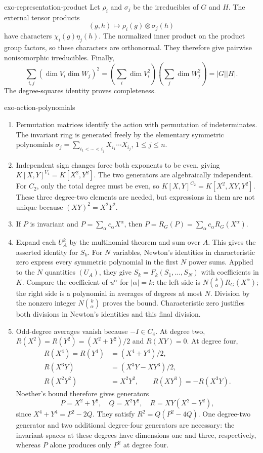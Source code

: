 \begin{correction}{exo-representation-product}
Let $\rho_i$ and $\sigma_j$ be the irreducibles of $G$ and $H$.
The external tensor products
\[
 (g,h)\longmapsto\rho_i(g)\otimes\sigma_j(h)
\]
have characters $\chi_i(g)\eta_j(h)$. The normalized inner product
on the product group factors, so these characters are orthonormal.
They therefore give pairwise nonisomorphic irreducibles. Finally,
\[
 \sum_{i,j}(\dim V_i\dim W_j)^2
       =\left(\sum_i\dim V_i^2\right)\left(\sum_j\dim W_j^2\right)
       =|G||H|.
\]
The degree-squares identity proves completeness.
\end{correction}

\begin{correction}{exo-action-polynomials}
\begin{enumerate}
\item Permutation matrices identify the action with permutation of
indeterminates. The invariant ring is generated freely by the elementary
symmetric polynomials
$\sigma_j=\sum_{i_1<\cdots<i_j}X_{i_1}\cdots X_{i_j}$, $1\leq j\leq n$.
\item Independent sign changes force both exponents to be even, giving
$K[X,Y]^{V_4}=K[X^2,Y^2]$. The two generators are algebraically independent.
For $C_2$, only the total degree must be even, so
$K[X,Y]^{C_2}=K[X^2,XY,Y^2]$. These three degree-two elements are needed,
but expressions in them are not unique because $(XY)^2=X^2Y^2$.
\item If $P$ is invariant and $P=\sum_\alpha c_\alpha X^\alpha$, then
$P=R_G(P)=\sum_\alpha c_\alpha R_G(X^\alpha)$.
\item Expand each $U_A^k$ by the multinomial theorem and sum over $A$.
This gives the asserted identity for $S_k$. For $N$ variables, Newton's
identities in characteristic zero express every symmetric polynomial
in the first $N$ power sums. Applied to the $N$ quantities $(U_A)$,
they give $S_k=F_k(S_1,\ldots,S_N)$ with coefficients in $K$.
Compare the coefficient of $u^\alpha$ for $|\alpha|=k$: the left side
is $N\binom{k}{\alpha}R_G(X^\alpha)$; the right side is a polynomial
in averages of degrees at most $N$. Division by the nonzero integer
$N\binom{k}{\alpha}$ proves the bound. Characteristic zero justifies
both divisions in Newton's identities and this final division.
\item Odd-degree averages vanish because $-I\in C_4$. At degree two,
$R(X^2)=R(Y^2)=(X^2+Y^2)/2$ and $R(XY)=0$. At degree four,
\[
 \begin{aligned}
 R(X^4)=R(Y^4)&=(X^4+Y^4)/2,\\
 R(X^3Y)&=(X^3Y-XY^3)/2,\\
 R(X^2Y^2)&=X^2Y^2,\qquad R(XY^3)=-R(X^3Y).
 \end{aligned}
\]
Noether's bound therefore gives generators
\[
 P=X^2+Y^2,\quad Q=X^2Y^2,\quad R=XY(X^2-Y^2),
\]
since $X^4+Y^4=P^2-2Q$. They satisfy $R^2=Q(P^2-4Q)$.
One degree-two generator and two additional degree-four generators are
necessary: the invariant spaces at these degrees have dimensions one
and three, respectively, whereas $P$ alone produces only $P^2$ at degree four.
\end{enumerate}
\end{correction}

